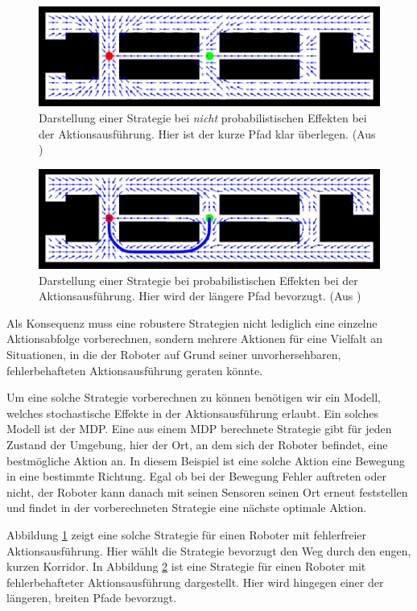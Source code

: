 \documentclass[a4paper]{IEEEtran}
\begin{document}
\begin{figure}[ht]
	\centering
	\includegraphics[scale=0.72]{images/autnmRobot_detActionMDP.png}
	\caption{Darstellung einer Strategie bei \emph{nicht} probabilistischen Effekten bei der Aktionsausführung. Hier ist der kurze Pfad klar überlegen. (Aus \cite{thrun2005probabilistic})}
	\label{autnmRobot_detA}
\end{figure}

\begin{figure}[ht]
	\centering
	\includegraphics[scale=0.72]{images/autnmRobot_ndetActionMDP.png}
	\caption{Darstellung einer Strategie bei probabilistischen Effekten bei der Aktionsausführung. Hier wird der längere Pfad bevorzugt. (Aus \cite{thrun2005probabilistic})}
	\label{autnmRobot_ndetA}
\end{figure}

Als Konsequenz muss eine robustere Strategien nicht lediglich eine einzelne Aktionsabfolge vorberechnen, sondern mehrere Aktionen für eine Vielfalt an Situationen, in die der Roboter auf Grund seiner unvorhersehbaren, fehlerbehafteten Aktionsausführung geraten könnte.

Um eine solche Strategie vorberechnen zu können benötigen wir ein Modell, welches stochastische Effekte in der Aktionsausführung erlaubt. Ein solches Modell ist der MDP. Eine aus einem MDP berechnete Strategie gibt für jeden Zustand der Umgebung, hier der Ort, an dem sich der Roboter befindet, eine bestmögliche Aktion an. In diesem Beispiel ist eine solche Aktion eine Bewegung in eine bestimmte Richtung. Egal ob bei der Bewegung Fehler auftreten oder nicht, der Roboter kann danach mit seinen Sensoren seinen Ort erneut feststellen und findet in der vorberechneten Strategie eine nächste optimale Aktion.

Abbildung \ref{autnmRobot_detA} zeigt eine solche Strategie für einen Roboter mit fehlerfreier Aktionsausführung. Hier wählt die Strategie bevorzugt den Weg durch den engen, kurzen Korridor. In Abbildung \ref{autnmRobot_ndetA} ist eine Strategie für einen Roboter mit fehlerbehafteter Aktionsausführung dargestellt. Hier wird hingegen einer der längeren, breiten Pfade bevorzugt.
\end{document}
